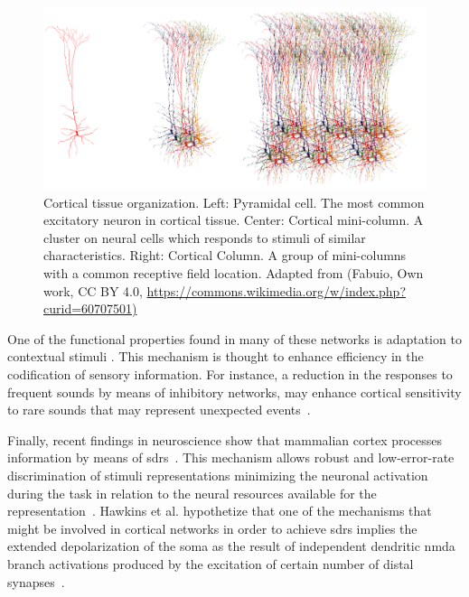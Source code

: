 \documentclass[10pt,letterpaper]{article}
\begin{document}
\begin{figure}[h!]
    \centering
    \includegraphics[width=1.0\textwidth]{Biological.png}
    \caption{Cortical tissue organization. Left: Pyramidal cell. The most common excitatory neuron in cortical tissue.
    Center: Cortical mini-column. A cluster on neural cells which responds to stimuli of similar characteristics.
    Right: Cortical Column. A group of mini-columns with a common receptive field location.
    Adapted from (Fabuio, Own work, CC BY 4.0, \url{https://commons.wikimedia.org/w/index.php?curid=60707501)}}
    \label{fig:Biological}
\end{figure}

\pagebreak

One of the functional properties found in many of these networks is adaptation to contextual stimuli \cite{KRAUSE201436,doi:10.1167/16.13.1}. This mechanism is thought to enhance efficiency in the codification of sensory information. For instance, a reduction in the responses to frequent sounds by means of inhibitory networks, may enhance cortical sensitivity to rare sounds that may represent unexpected events~\cite{Natan2015ComplementaryCO,nachum_2003,Javitt11962}.

Finally, recent findings in neuroscience show that mammalian cortex processes information by means of \glspl{sdr}~\cite{barth_2012}. This mechanism allows robust and low-error-rate discrimination of stimuli representations minimizing the neuronal activation during the task in relation to the neural resources available for the representation~\cite{ahmad_2016}. Hawkins et al. \cite{hawkins_2016} hypothetize that one of the mechanisms that might be involved in cortical networks in order to achieve \glspl{sdr} implies the extended depolarization of the soma as the result of independent dendritic \gls{nmda} branch activations produced by the excitation of certain number of distal synapses~\cite{antic_2010, major_2013}.
\end{document}
